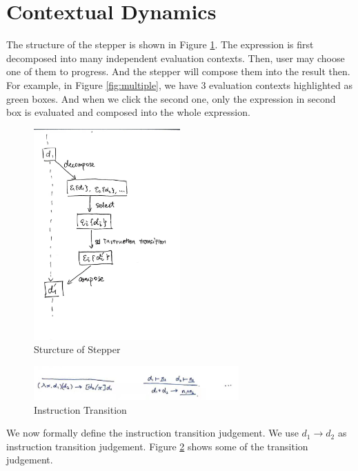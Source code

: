 \section{Contextual Dynamics}



The structure of the stepper is shown in Figure \ref{fig:structure}. The expression is first decomposed into many independent evaluation contexts. Then, user may choose one of them to progress. And the stepper will compose them into the result then. For example, in Figure \ref{fig:multiple}, we have 3 evaluation contexts highlighted as green boxes. And when we click the second one, only the expression in second box is evaluated and composed into the whole expression.

\begin{figure}[htbp]
  \centering
  \includegraphics[width=0.5\textwidth]{structure.png}
  \caption{Sturcture of Stepper}
  \label{fig:structure}
\end{figure}

\begin{figure}[htbp]
  \centering
  \includegraphics[width=0.7\textwidth]{instr_trans.png}
  \caption{Instruction Transition}
  \label{fig:instr_trans}
\end{figure}

We now formally define the instruction transition judgement. We use $d_1 \to d_2$ as instruction transition judgement. Figure \ref{fig:instr_trans} shows some of the transition judgement.

